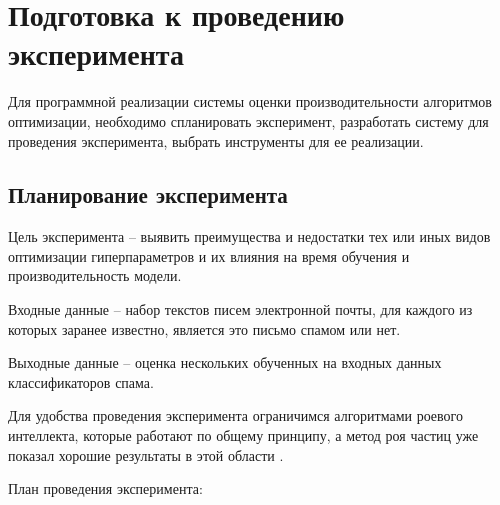 \section{Подготовка к проведению эксперимента}

Для программной реализации системы оценки производительности 
алгоритмов оптимизации, необходимо спланировать эксперимент, 
разработать систему для проведения эксперимента, выбрать инструменты для ее реализации.

\subsection{Планирование эксперимента}

Цель эксперимента -- выявить преимущества и недостатки тех или иных видов 
оптимизации гиперпараметров и их влияния на время обучения и производительность 
модели. 

Входные данные -- набор текстов писем электронной почты, для каждого из которых 
заранее известно, является это письмо спамом или нет.

Выходные данные -- оценка нескольких обученных на входных данных классификаторов спама. 

Для удобства проведения эксперимента ограничимся алгоритмами роевого интеллекта, 
которые работают по общему принципу, а метод роя частиц уже показал хорошие 
результаты в этой области \cite{IEEE}.

План проведения эксперимента:

